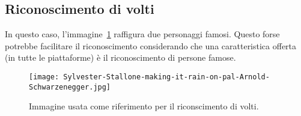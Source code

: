 \subsection{Riconoscimento di volti}\label{subsec:riconscimento-volti}
In questo caso, l'immagine~\ref{fig:stallone} raffigura due personaggi famosi. Questo forse potrebbe facilitare il riconoscimento
considerando che una caratteristica offerta (in tutte le piattaforme) è il riconoscimento di persone famose.
%
\begin{figure}[!h]
\begin{center}
	\texttt{[image: Sylvester-Stallone-making-it-rain-on-pal-Arnold-Schwarzenegger.jpg]}
{\scriptsize \caption{Immagine usata come riferimento per il riconscimento di volti.}
\label{fig:stallone}}
\end{center}
\end{figure}
%
